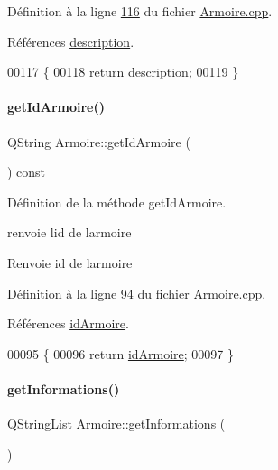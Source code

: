 Définition à la ligne \hyperlink{_armoire_8cpp_source_l00116}{116} du fichier \hyperlink{_armoire_8cpp_source}{Armoire.\+cpp}.



Références \hyperlink{_armoire_8h_source_l00068}{description}.


\begin{DoxyCode}
00117 \{
00118     \textcolor{keywordflow}{return} \hyperlink{class_armoire_aa18be328693d7602439c779e30156c02}{description};
00119 \}
\end{DoxyCode}
\mbox{\label{class_armoire_a1a76e497170632b30f9821b396d53cec}} 
\paragraph{\texorpdfstring{get\+Id\+Armoire()}{getIdArmoire()}}
{\footnotesize\ttfamily Q\+String Armoire\+::get\+Id\+Armoire (\begin{DoxyParamCaption}{ }\end{DoxyParamCaption}) const}



Définition de la méthode get\+Id\+Armoire. 

renvoie l\textquotesingle{}id de l\textquotesingle{}armoire \begin{DoxyReturn}{Renvoie}
id de l\textquotesingle{}armoire 
\end{DoxyReturn}


Définition à la ligne \hyperlink{_armoire_8cpp_source_l00094}{94} du fichier \hyperlink{_armoire_8cpp_source}{Armoire.\+cpp}.



Références \hyperlink{_armoire_8h_source_l00066}{id\+Armoire}.


\begin{DoxyCode}
00095 \{
00096     \textcolor{keywordflow}{return} \hyperlink{class_armoire_a131caceb7d4b90cb7761851757e80f57}{idArmoire};
00097 \}
\end{DoxyCode}
\mbox{\label{class_armoire_a3e4d2ffc2fb91dd24d1160305ad36555}} 
\paragraph{\texorpdfstring{get\+Informations()}{getInformations()}}
{\footnotesize\ttfamily Q\+String\+List Armoire\+::get\+Informations (\begin{DoxyParamCaption}{ }\end{DoxyParamCaption})}




